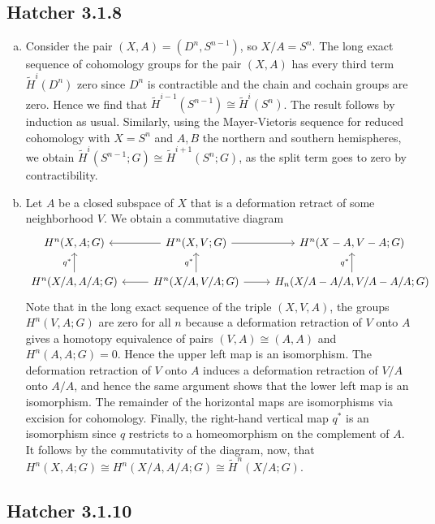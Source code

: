 \documentclass{../mathnotes}
\begin{document}
\subsection*{Hatcher 3.1.8}
\begin{enumerate}[(a)]
    \item Consider the pair $(X,A)=(D^n,S^{n-1})$, so $X/A=S^n$. The long exact sequence of cohomology
        groups for the pair $(X,A)$ has every third term $\tilde H^i(D^n)$ zero since $D^n$ is contractible
        and the chain and cochain groups are zero. Hence we find that $\tilde H^{i-1}(S^{n-1})\cong \tilde H^i(S^n)$.
        The result follows by induction as usual.
        Similarly, using the Mayer-Vietoris sequence for reduced cohomology with $X=S^n$ and $A,B$ the
        northern and southern hemispheres, we obtain $\tilde H^i(S^{n-1};G)\cong \tilde H^{i+1}(S^n;G)$,
        as the split term goes to zero by contractibility.
    \item Let $A$ be a closed subspace of $X$ that is a deformation retract of some neighborhood $V$.
        We obtain a commutative diagram
        \begin{equation*}
            \begin{tikzcd}
                H^n(X,A;G) & H^n(X,V;G)\ar{l}\ar{r} & H^n(X-A,V-A;G)\\
                H^n(X/A,A/A;G)\ar{u}{q^*} & H^n(X/A,V/A;G)\ar{l}\ar{u}{q^*}\ar{r} & H_n(X/A-A/A, V/A-A/A;G)\ar{u}{q^*}
            \end{tikzcd}
        \end{equation*}
        Note that in the long exact sequence of the triple $(X,V,A)$, the groups $H^n(V,A;G)$ are zero for all $n$
        because a deformation retraction of $V$ onto $A$ gives a homotopy equivalence of pairs $(V,A)\cong (A,A)$
        and $H^n(A,A;G)=0$. Hence the upper left map is an isomorphism. The deformation retraction of $V$ onto $A$
        induces a deformation retraction of $V/A$ onto $A/A$, and hence the same argument shows that the lower left
        map is an isomorphism. The remainder of the horizontal maps are isomorphisms via excision for cohomology.
        Finally, the right-hand vertical map $q^*$ is an isomorphism since $q$ restricts to a homeomorphism on the
        complement of $A$. It follows by the commutativity of the diagram, now, that $H^n(X,A;G)\cong H^n(X/A,A/A;G)\cong\tilde H^n(X/A;G)$.
\end{enumerate}

\subsection*{Hatcher 3.1.10}
\end{document}
